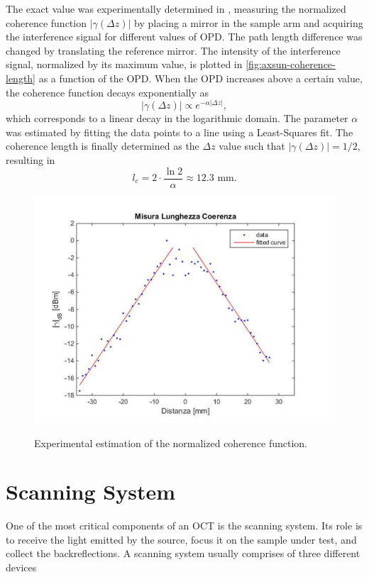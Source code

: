The exact value was experimentally determined in \cite{Calabrese2017}, measuring the normalized coherence function $|\gamma(\Delta z)|$ by placing a mirror in the sample arm and acquiring the interference signal for different values of \ac{OPD}. The path length difference was changed by translating the reference mirror. The intensity of the interference signal, normalized by its maximum value, is plotted in  \autoref{fig:axsun-coherence-length} as a function of the \ac{OPD}. When the \ac{OPD} increases above a certain value, the coherence function decays exponentially as
\begin{equation}
|\gamma(\Delta z)| \propto e^{-\alpha |\Delta z|},
\end{equation}
which corresponds to a linear decay in the logarithmic domain. The parameter $\alpha$ was estimated by fitting the data points to a line using a Least-Squares fit. The coherence length is finally determined as the $\Delta z$ value such that $|\gamma(\Delta z)| = 1/2$, resulting in
\begin{equation}
	l_c = 2 \cdot \frac{\ln 2}{\alpha} \approx 12.3 \text{ mm.}
\end{equation}


\begin{figure}[hbt]
	\myfloatalign
	{\includegraphics[width=0.8\linewidth]{gfx/ch3/axsun-coherence-length}}\\
	\caption{Experimental estimation of the normalized coherence function.}\label{fig:axsun-coherence-length}
\end{figure}

\newpage

\section{Scanning System}
One of the most critical components of an OCT is the scanning system. Its role is to receive the light emitted by the source, focus it on the sample under test, and collect the backreflections. A scanning system usually comprises of three different devices

